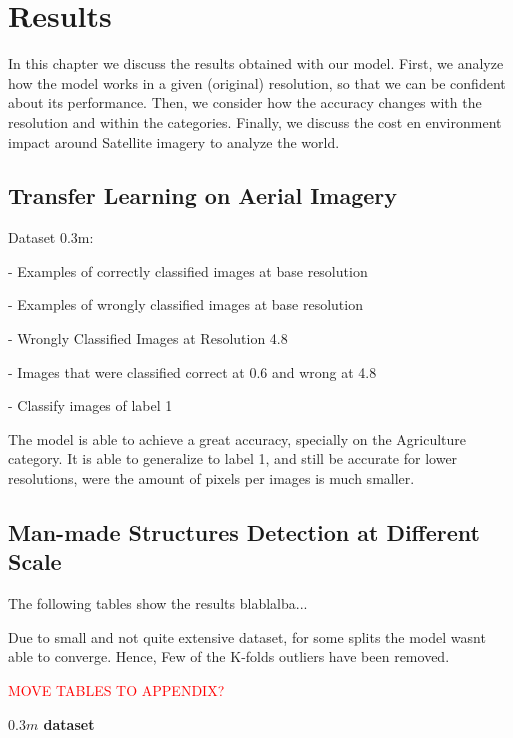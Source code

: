 
\chapter{Results} 

\label{Chapter5}


In this chapter we discuss the results obtained with our model. First, we analyze how the model works in a given (original) resolution, so that we can be confident about its performance. Then, we consider how the accuracy changes with the resolution and within the categories. Finally, we discuss the cost en environment impact around Satellite imagery to analyze the world. 

\section{Transfer Learning on Aerial Imagery}

Dataset 0.3m:

- Examples of correctly classified images at base resolution

- Examples of wrongly classified images at base resolution

- Wrongly Classified Images at Resolution 4.8

- Images that were classified correct at 0.6 and wrong at 4.8

- Classify images of label 1

The model is able to achieve a great accuracy, specially on the Agriculture category. It is able to generalize to label 1, and still be accurate for lower resolutions, were the amount of pixels per images is much smaller.

\section{Man-made Structures Detection at Different Scale}

The following tables show the results blablalba...

Due to small and not quite extensive dataset, for some splits the model wasnt able to converge. Hence, Few of the K-folds outliers have been removed.

\textcolor{red}{MOVE TABLES TO APPENDIX?}

\begin{table}
    \centering
	
	\captionsetup{width=0.7\linewidth}
	\caption{\textbf{$0.3m$ dataset}}
\end{table}

